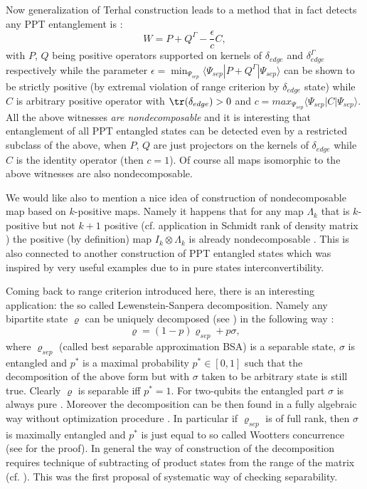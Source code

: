 \documentclass[rmp,12pt,preprint]{revtex4-2}
\begin{document}
Now generalization of Terhal construction leads to a method that in
fact detects any PPT entanglement is \cite{Lewenstein00b}:
\begin{equation}
W= P + Q^{\Gamma}-\frac{\epsilon}{c}C,
\end{equation}
with $P$, $Q$ being positive operators supported on kernels of
$\delta_{edge}$ and $\delta_{edge}^{\Gamma}$ respectively while the
parameter $\epsilon=\min_{\Psi_{sep}}\langle \Psi_{sep}|P + Q^{\Gamma}
| \Psi_{sep}\rangle$ can be shown to be strictly positive (by extremal
violation of range criterion by $\delta_{edge}$ state) while $C$ is
arbitrary positive operator with ${\tr}(\delta_{edge})>0$ and
$c=max_{\Psi_{sep}}\langle \Psi_{sep}|C| \Psi_{sep}\rangle$. All the
above witnesses {\it are nondecomposable } and it is interesting that
entanglement of all PPT entangled states can be detected even by a
restricted subclass of the above, when $P$, $Q$ are just projectors on
the kernels of $\delta_{edge}$ while $C$ is the identity operator
(then $c=1$). Of course all maps isomorphic to the above witnesses are
also nondecomposable.

We would like also to mention a nice idea of construction of
nondecomposable map based on $k$-positive maps. Namely it happens that
for any map $\Lambda_{k}$ that is $k$-positive but not $k+1$ positive
(cf. application in Schmidt rank of density matrix
\cite{Terhal-Pawel-rank}) the positive (by definition) map $I_{k}
\otimes \Lambda_{k}$ is already nondecomposable \cite{PianiM}. This is
also connected to another construction of PPT entangled states
\cite{PianiM} which was inspired by very useful examples due to
\cite{Ishizaka04} in pure states interconvertibility.

Coming back to range criterion introduced here, there is an
interesting application: the so called Lewenstein-Sanpera
decomposition. Namely any bipartite state $ \varrho $ can be uniquely
decomposed (see \cite{KarnasL2000-bsa}) in the following way
\cite{LewensteinSanpera-bsa}:
\begin{equation}
\varrho=(1-p)\varrho_{sep}+ p \sigma,
\end{equation}
where $\varrho_{sep}$ (called best separable approximation BSA) is a
separable state, $\sigma$ is entangled and $p^{*}$ is a maximal
probability $p^{*}\in [0,1]$ such that the decomposition of the above
form but with $\sigma$ taken to be arbitrary state is still
true. Clearly $\varrho$ is separable iff $p^{*}=1$.  For two-qubits
the entangled part $\sigma$ is always pure
\cite{LewensteinSanpera-bsa}.  Moreover the decomposition can be then
found in a fully algebraic way without optimization procedure
\cite{WellensKus}. In particular if $\varrho_{sep}$ is of full rank,
then $\sigma$ is maximally entangled and $p^{*}$ is just equal to so
called Wootters concurrence (see \cite{WellensKus} for the proof). In
general the way of construction of the decomposition requires
technique of subtracting of product states from the range of the
matrix \cite{LewensteinSanpera-bsa} (cf.  \cite{Karnas,Ho00}). This
was the first proposal of systematic way of checking separability.
\end{document}
